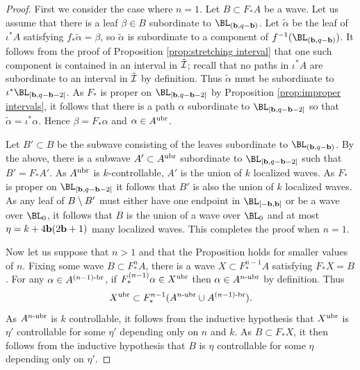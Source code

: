 \documentclass[12pt]{amsart}
\begin{document}
\begin{proof}
	First we consider the case where $n = 1$.
	Let $B\subset F_*A$ be a wave.
	Let us assume that there is a leaf $\beta\in B$  subordinate to $\BL_{(\bound, q-\bound)}$. Let $\tilde{\alpha}$ be the leaf of $\iota^*A$ satisfying $f_*\tilde\alpha = \beta$, so $\tilde\alpha$ is subordinate to a component of $f^{-1}(\BL_{(\bound, q-\bound)})$.
	It follows from the proof of 
	Proposition \ref{prop:stretching interval} that one such component is contained in an interval in $\tilde {\mathcal I}$; recall that no paths in $\iota^*A$ are subordinate to an interval in $\tilde {\mathcal I}$ by definition. Thus $\tilde{\alpha}$ must be subordinate to $\iota^*\BL_{[\bound, q-\bound-2]}$. 
	As $F_*$ is proper on $\BL_{[\bound, q-\bound-2]}$ by Proposition \ref{prop:improper intervals}, it follows that there is a path $\alpha$ subordinate to $\BL_{[\bound, q-\bound-2]}$ so that $\tilde \alpha=\iota^*\alpha$. Hence $\beta = F_*\alpha$ and $\alpha\in A^{\mathrm{ubr}}$. 
	
	Let $B'\subset B$ be the subwave consisting of the leaves subordinate to $\BL_{(\bound, q-\bound)}$. By the above, there is a subwave $A'\subset A^{\mathrm{ubr}}$ subordinate to $\BL_{{[\bound, q-\bound-2]}}$ such that $B' = F_*A'$. As $A^{\mathrm{ubr}}$ is $k$-controllable, $A'$ is the union of $k$ localized waves. As $F_*$ is proper on $\BL_{[\bound, q-\bound-2]}$ it follows that $B'$ is also the union of $k$  localized waves. As any leaf of $B\setminus B'$ must either have one endpoint in $\BL_{[-\bound, \bound]}$ or be a wave over $\BL_0$, it follows that $B$ is the union of a wave over $\BL_0$ and at most $\eta = k+4\mathbf b(2\mathbf b+1)$ many localized waves. This completes the proof when $n = 1$.
	
	Now let us suppose that $n > 1$ and that the Proposition holds for smaller values of $n$. Fixing some wave $B\subset F_*^nA$, there is a wave $X\subset F_*^{n-1}A$ satisfying $F_*X = B$. For any $\alpha\in A^{(n-1)\text{-}{\mathrm{br}}}$, if $F_*^{(n-1)}\alpha\in X^{\mathrm{ubr}}$ then $\alpha\in A^{n\text{-}{\mathrm{ubr}}}$ by definition. 
	Thus 
	$$X^{\mathrm{ubr}}\subset F_*^{n-1}(A^{n\text{-}{\mathrm{ubr}}}\cup A^{(n-1)\text{-}{\mathrm{br}}}).$$
	As $A^{n\text{-}{\mathrm{ubr}}}$ is  $k$ controllable, it follows from the inductive hypothesis that $X^{\mathrm{ubr}}$ is $\eta'$ controllable for some $\eta'$ depending only on $n$ and $k$. As $B\subset F_*X$, it then follows from the inductive hypothesis that $B$ is  $\eta$ controllable for some $\eta$ depending only on $\eta'$.
\end{proof}
\end{document}
